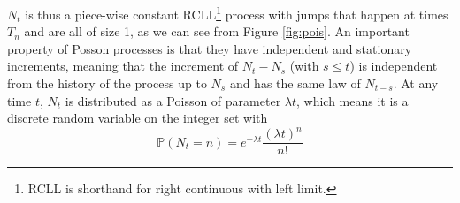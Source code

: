 $N_t$ is thus a piece-wise constant RCLL\footnote{RCLL is shorthand for right continuous with left limit.} process with jumps that happen at times $T_n$ and are all of size 1, as we can see from Figure \cref{fig:pois}.
An important property of Posson processes is that they have independent and stationary increments, meaning that the increment of $N_t - N_s$ (with $s\leq t$) is independent from the history of the process up to $N_s$ and has the same law of $N_{t-s}$.
At any time $t$, $N_t$ is distributed as a Poisson of parameter $\lambda t$, which means it is a discrete random variable on the integer set with
\begin{equation}
\label{eq:pois_pdf}
\mathbb{P}( N_t = n) = e^{-\lambda t}\frac{(\lambda t)^n}{n!}
\end{equation}



